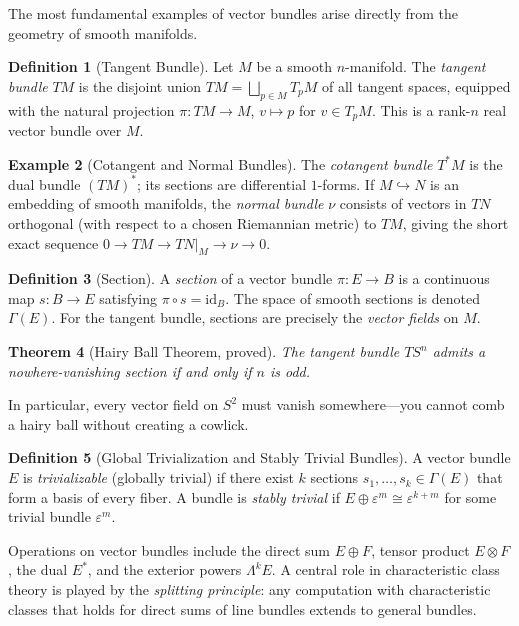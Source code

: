 \documentclass[12pt,a4paper]{amsart}
\newtheorem{theorem}{Theorem}[section]
\theoremstyle{definition}
\newtheorem{definition}[theorem]{Definition}
\newtheorem{example}[theorem]{Example}
\begin{document}
The most fundamental examples of vector bundles arise directly from the
geometry of smooth manifolds.

\begin{definition}[Tangent Bundle]
Let $M$ be a smooth $n$-manifold. The \emph{tangent bundle} $TM$ is the
disjoint union $TM = \bigsqcup_{p \in M} T_pM$ of all tangent spaces, equipped
with the natural projection $\pi \colon TM \to M$, $v \mapsto p$ for $v \in
T_pM$. This is a rank-$n$ real vector bundle over $M$.
\end{definition}

\begin{example}[Cotangent and Normal Bundles]
The \emph{cotangent bundle} $T^*M$ is the dual bundle $(TM)^*$; its sections
are differential $1$-forms. If $M \hookrightarrow N$ is an embedding of
smooth manifolds, the \emph{normal bundle} $\nu$ consists of vectors in $TN$
orthogonal (with respect to a chosen Riemannian metric) to $TM$, giving the
short exact sequence $0 \to TM \to TN|_M \to \nu \to 0$.
\end{example}

\begin{definition}[Section]
A \emph{section} of a vector bundle $\pi \colon E \to B$ is a continuous map
$s \colon B \to E$ satisfying $\pi \circ s = \mathrm{id}_B$. The space of smooth
sections is denoted $\Gamma(E)$. For the tangent bundle, sections are precisely
the \emph{vector fields} on $M$.
\end{definition}

\begin{theorem}[Hairy Ball Theorem, proved]
\label{thm:hairy}
The tangent bundle $TS^n$ admits a nowhere-vanishing section if and only if
$n$ is odd.
\end{theorem}

In particular, every vector field on $S^2$ must vanish somewhere---you cannot
comb a hairy ball without creating a cowlick.

\begin{definition}[Global Trivialization and Stably Trivial Bundles]
A vector bundle $E$ is \emph{trivializable} (globally trivial) if there exist
$k$ sections $s_1, \ldots, s_k \in \Gamma(E)$ that form a basis of every fiber.
A bundle is \emph{stably trivial} if $E \oplus \varepsilon^m \cong \varepsilon^{k+m}$
for some trivial bundle $\varepsilon^m$.
\end{definition}

Operations on vector bundles include the direct sum $E \oplus F$, tensor
product $E \otimes F$, the dual $E^*$, and the exterior powers
$\Lambda^k E$. A central role in characteristic class theory is played by the
\emph{splitting principle}: any computation with characteristic classes that
holds for direct sums of line bundles extends to general bundles.
\end{document}
